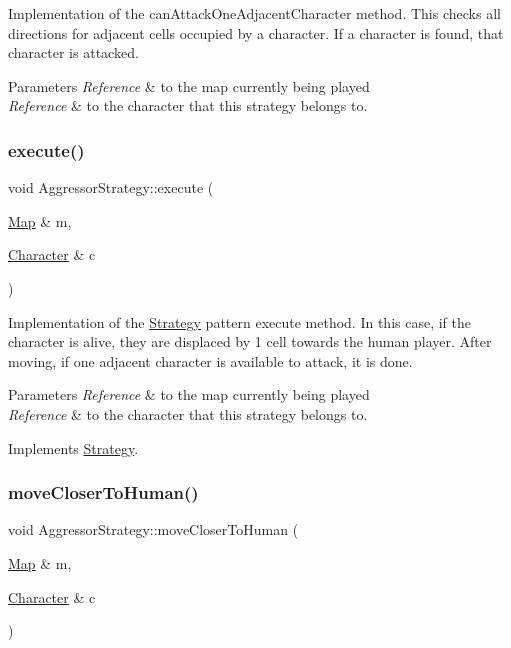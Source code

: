 Implementation of the can\+Attack\+One\+Adjacent\+Character method. This checks all directions for adjacent cells occupied by a character. If a character is found, that character is attacked. 
\begin{DoxyParams}{Parameters}
{\em Reference} & to the map currently being played \\
\hline
{\em Reference} & to the character that this strategy belongs to. \\
\hline
\end{DoxyParams}
\hypertarget{classAggressorStrategy_a64de03f063f8b195da7134965148f1c8}{}\label{classAggressorStrategy_a64de03f063f8b195da7134965148f1c8} 
\subsubsection{\texorpdfstring{execute()}{execute()}}
{\footnotesize\ttfamily void Aggressor\+Strategy\+::execute (\begin{DoxyParamCaption}\item[{\hyperlink{classMap}{Map} \&}]{m,  }\item[{\hyperlink{classCharacter}{Character} \&}]{c }\end{DoxyParamCaption})\hspace{0.3cm}{\ttfamily [virtual]}}

Implementation of the \hyperlink{classStrategy}{Strategy} pattern execute method. In this case, if the character is alive, they are displaced by 1 cell towards the human player. After moving, if one adjacent character is available to attack, it is done. 
\begin{DoxyParams}{Parameters}
{\em Reference} & to the map currently being played \\
\hline
{\em Reference} & to the character that this strategy belongs to. \\
\hline
\end{DoxyParams}


Implements \hyperlink{classStrategy}{Strategy}.

\hypertarget{classAggressorStrategy_a375f0346535b7a684f5222780d1cfde9}{}\label{classAggressorStrategy_a375f0346535b7a684f5222780d1cfde9} 
\subsubsection{\texorpdfstring{move\+Closer\+To\+Human()}{moveCloserToHuman()}}
{\footnotesize\ttfamily void Aggressor\+Strategy\+::move\+Closer\+To\+Human (\begin{DoxyParamCaption}\item[{\hyperlink{classMap}{Map} \&}]{m,  }\item[{\hyperlink{classCharacter}{Character} \&}]{c }\end{DoxyParamCaption})}

